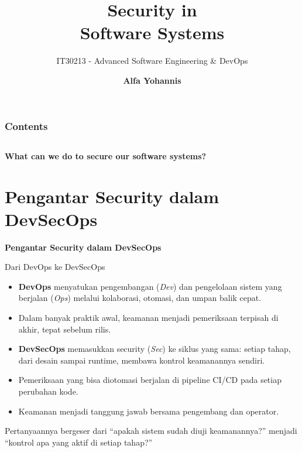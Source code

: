\documentclass[aspectratio=169, table]{beamer}
\title{\Huge Security in \\
	Software Systems\vspace{8pt}}
\subtitle{IT30213 - Advanced Software Engineering \& DevOps}
\author{\textbf{Alfa Yohannis}}
\begin{document}
	
	\frame{\titlepage}
	

	\begin{frame}[fragile]
		\frametitle{Contents}
		\vspace{20pt}
		\begin{columns}[t]
			\tableofcontents[sections={1-5}]
			
			\tableofcontents[sections={6-20}]
		\end{columns}
	\end{frame}
	
	\begin{frame}{\hfill}
		\centering
		\Huge{\textbf{What can we do to secure our software systems?}}
	\end{frame}
	

\section{Pengantar Security dalam DevSecOps}

	\begin{frame}{\hfill}
		\centering
		\Huge{\textbf{Pengantar Security dalam DevSecOps}}
	\end{frame}

\begin{frame}{Dari DevOps ke DevSecOps}
	\vspace{10pt}
	\begin{itemize}
		\item \textbf{DevOps} menyatukan pengembangan (\emph{Dev}) dan pengelolaan sistem yang berjalan (\emph{Ops}) melalui kolaborasi, otomasi, dan umpan balik cepat.
		\item Dalam banyak praktik awal, keamanan menjadi pemeriksaan terpisah di akhir, tepat sebelum rilis.
		\item \textbf{DevSecOps} memasukkan security (\emph{Sec}) ke siklus yang sama: setiap tahap, dari desain sampai runtime, membawa kontrol keamanannya sendiri.
		\item Pemeriksaan yang bisa diotomasi berjalan di pipeline CI/CD pada setiap perubahan kode.
		\item Keamanan menjadi tanggung jawab bersama pengembang dan operator.
	\end{itemize}

	\vspace{6pt}
	{\footnotesize Pertanyaannya bergeser dari ``apakah sistem sudah diuji keamanannya?'' menjadi ``kontrol apa yang aktif di setiap tahap?''}
\end{frame}
\end{document}
